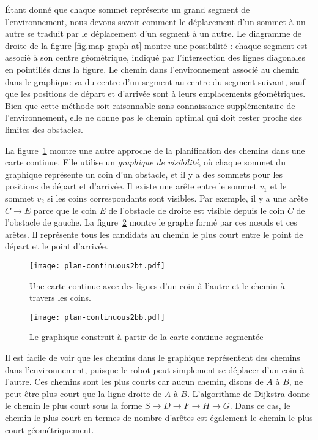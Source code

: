 Étant donné que chaque sommet représente un grand segment de l'environnement, nous devons savoir comment le déplacement d'un sommet à un autre se traduit par le déplacement d'un segment à un autre. Le diagramme de droite de la figure \ref{fig.map-graph-at} montre une possibilité : chaque segment est associé à son centre géométrique, indiqué par l'intersection des lignes diagonales en pointillés dans la figure. Le chemin dans l'environnement associé au chemin dans le graphique va du centre d'un segment au centre du segment suivant, sauf que les positions de départ et d'arrivée sont à leurs emplacements géométriques. Bien que cette méthode soit raisonnable sans connaissance supplémentaire de l'environnement, elle ne donne pas le chemin optimal qui doit rester proche des limites des obstacles.

La figure~\ref{fig.map-graph-bt} montre une autre approche de la planification des chemins dans une carte continue. Elle utilise un \emph{graphique de visibilité}, où chaque sommet du graphique représente un coin d'un obstacle, et il y a des sommets pour les positions de départ et d'arrivée. Il existe une arête entre le sommet $v_1$ et le sommet $v_2$ si les coins correspondants sont visibles. Par exemple, il y a une arête $C\rightarrow E$ parce que le coin $E$ de l'obstacle de droite est visible depuis le coin $C$ de l'obstacle de gauche. La figure~\ref{fig.map-graph-bb} montre le graphe formé par ces nœuds et ces arêtes. Il représente tous les candidats au chemin le plus court entre le point de départ et le point d'arrivée.

\begin{figure}
\begin{center}
\texttt{[image: plan-continuous2bt.pdf]}
\end{center}
\caption{Une carte continue avec des lignes d'un coin à l'autre et le chemin à travers les coins.}\label{fig.map-graph-bt}
\end{figure}

\begin{figure}
\begin{center}
\texttt{[image: plan-continuous2bb.pdf]}
\end{center}
\caption{Le graphique construit à partir de la carte continue segmentée}
\label{fig.map-graph-bb}
\end{figure}

Il est facile de voir que les chemins dans le graphique représentent des chemins dans l'environnement, puisque le robot peut simplement se déplacer d'un coin à l'autre. Ces chemins sont les plus courts car aucun chemin, disons de $A$ à $B$, ne peut être plus court que la ligne droite de $A$ à $B$. L'algorithme de Dijkstra donne le chemin le plus court sous la forme $S\rightarrow D\rightarrow F\rightarrow H\rightarrow G$. Dans ce cas, le chemin le plus court en termes de nombre d'arêtes est également le chemin le plus court géométriquement.


